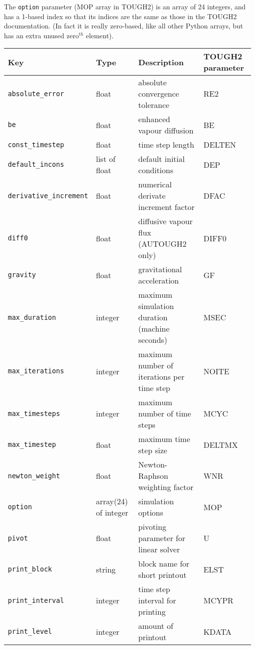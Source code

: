 The \texttt{option} parameter (MOP array in TOUGH2) is an array of 24 integers, and has a 1-based index so that its indices are the same as those in the TOUGH2 documentation.  (In fact it is really zero-based, like all other Python arrays, but has an extra unused zero$^{th}$ element).

\begin{sidewaystable}
  \begin{center}
    \begin{tabular}{|l|l|l|l|}
      \hline
      \textbf{Key} & \textbf{Type} & \textbf{Description} & \textbf{TOUGH2 parameter}\\
      \hline
      \texttt{absolute\_error} & float & absolute convergence tolerance & RE2\\
      \texttt{be} & float & enhanced vapour diffusion & BE\\
      \texttt{const\_timestep} & float & time step length & DELTEN\\
      \texttt{default\_incons} & list of float & default initial conditions & DEP\\
      \texttt{derivative\_increment} & float & numerical derivate increment factor & DFAC\\
      \texttt{diff0} & float & diffusive vapour flux (AUTOUGH2 only) & DIFF0\\
      \texttt{gravity} & float & gravitational acceleration & GF\\
      \texttt{max\_duration} & integer & maximum simulation duration (machine seconds) & MSEC\\
      \texttt{max\_iterations} & integer & maximum number of iterations per time step & NOITE\\
      \texttt{max\_timesteps} & integer & maximum number of time steps & MCYC\\
      \texttt{max\_timestep} & float & maximum time step size & DELTMX\\
      \texttt{newton\_weight} & float & Newton-Raphson weighting factor & WNR\\
      \texttt{option} & array(24) of integer & simulation options & MOP\\
      \texttt{pivot} & float & pivoting parameter for linear solver & U\\
      \texttt{print\_block} & string & block name for short printout & ELST\\
      \texttt{print\_interval} & integer & time step interval for printing & MCYPR\\
      \texttt{print\_level} & integer & amount of printout & KDATA\\

\end{tabular}
\end{center}
\end{sidewaystable}
